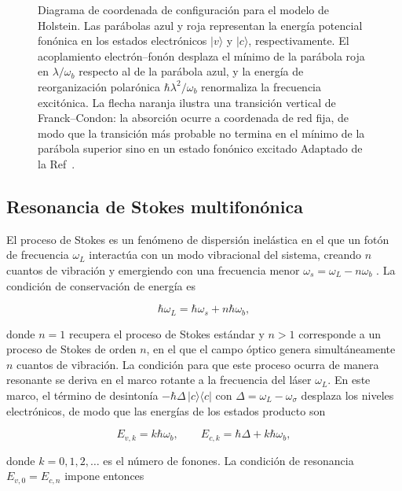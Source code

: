 \begin{figure}[h]
\begin{tikzpicture}[>=stealth, thick, font=\small]
	\end{tikzpicture}
	\caption{Diagrama de coordenada de configuración para el modelo de Holstein. Las parábolas azul y roja representan la energía potencial fonónica en los estados electrónicos $|v\rangle$ y $|c\rangle$, respectivamente. El acoplamiento electrón--fonón desplaza el mínimo de la parábola roja en $\lambda/\omega_b$ respecto al de la parábola azul, y la energía de reorganización polarónica $\hbar\lambda^2/\omega_b$ renormaliza la frecuencia excitónica. La flecha naranja ilustra una transición vertical de Franck--Condon: la absorción ocurre a coordenada de red fija, de modo que la transición más probable no termina en el mínimo de la parábola superior sino en un estado fonónico excitado Adaptado de la Ref~\cite{mahan2000}.}
	\label{fig:holstein}
\end{figure}

\subsection{Resonancia de Stokes multifonónica}
\label{sec:stokes}

El proceso de Stokes es un fenómeno de dispersión inelástica en el que un fotón de frecuencia $\omega_L$ interactúa con un modo vibracional del sistema, creando $n$ cuantos de vibración y emergiendo con una frecuencia menor $\omega_s = \omega_L - n\omega_b$ \cite{loudon2000}. La condición de conservación de energía es

\begin{equation}
	\hbar\omega_L = \hbar\omega_s + n\hbar\omega_b,
	\label{eq:conservacion_stokes}
\end{equation}

donde $n = 1$ recupera el proceso de Stokes estándar y $n > 1$ corresponde a un proceso de Stokes de orden $n$, en el que el campo óptico genera simultáneamente $n$ cuantos de vibración. La condición para que este proceso ocurra de manera resonante se deriva en el marco rotante a la frecuencia del láser $\omega_L$. En este marco, el término de desintonía $-\hbar\Delta\,|c\rangle\langle c|$ con $\Delta = \omega_L - \omega_\sigma$ desplaza los niveles electrónicos, de modo que las energías de los estados producto son

\begin{equation}
	E_{v,k} = k\hbar\omega_b, \qquad
	E_{c,k} = \hbar\Delta + k\hbar\omega_b,
	\label{eq:energias_mr}
\end{equation}

donde $k = 0, 1, 2, \ldots$ es el número de fonones. La condición de resonancia $E_{v,0} = E_{c,n}$ impone entonces

